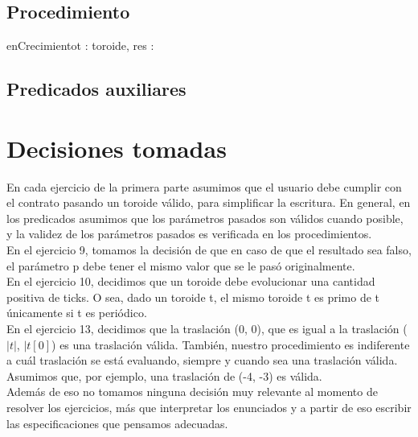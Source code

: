 \documentclass[a4paper]{article}
\begin{document}
\subsection{Procedimiento}
\begin{proc}{enCrecimiento}{\In t : toroide, \Out res : \bool}{}
\end{proc}

\subsection{Predicados auxiliares}

\section{Decisiones tomadas}
En cada ejercicio de la primera parte asumimos que el usuario debe cumplir con el contrato pasando un toroide válido, para simplificar la escritura.
    En general, en los predicados asumimos que los parámetros pasados son válidos cuando posible, y la validez de los parámetros pasados es verificada en los procedimientos.\\ 
\indent En el ejercicio 9, tomamos la decisión de que en caso de que el resultado sea falso, el parámetro p debe tener el mismo valor que se le pasó originalmente. \\
\indent En el ejercicio 10, decidimos que un toroide debe evolucionar una cantidad positiva de ticks. O sea, dado un toroide t, el mismo toroide t 
es primo de t únicamente si t es periódico. \\
\indent En el ejercicio 13, decidimos que la traslación (0, 0), que es igual a la traslación
($|t|$, $|t[0]$) es una traslación válida. 
También, nuestro procedimiento es indiferente a cuál traslación se está evaluando, siempre y cuando sea una traslación válida. 
Asumimos que, por ejemplo, una traslación de (-4, -3) es válida.\\
\indent Además de eso no tomamos ninguna decisión muy relevante al momento de resolver los ejercicios, más que interpretar los enunciados y a partir de eso escribir las especificaciones que pensamos adecuadas.
\end{document}
